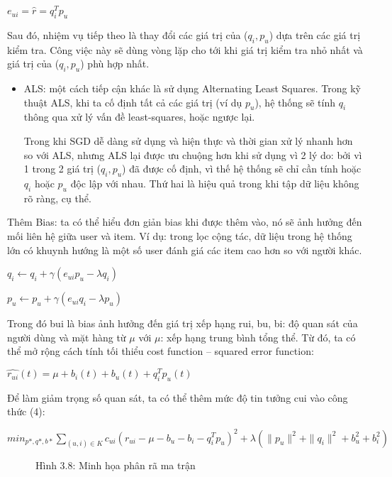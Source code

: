 \documentclass[a4paper,12pt,numbered,print,index,custombib, oneside, custommargin]{report}
\newcommand\tab[1][1cm]{\hspace*{#1}}
\begin{document}
\tab $e_{ui} = \hat{r} = q_i^T p_u $	\par


\tab Sau đó, nhiệm vụ tiếp theo là 	thay đổi các giá trị của ($q_i, p_u$) dựa trên các \tab giá trị kiểm tra. Công việc này sẽ dùng vòng lặp cho tới khi giá trị kiểm tra \tab nhỏ nhất và giá trị của ($q_i, p_u$) phù hợp nhất.
\begin{itemize}
\item ALS: một cách tiếp cận khác là sử dụng Alternating Least Squares. Trong kỹ thuật ALS, khi ta cố định tất cả các giá trị (ví dụ $p_u$), hệ thống sẽ tính $q_i$ thông qua xử lý vấn đề least-squares, hoặc ngược lại.\par
Trong khi SGD dễ dàng sử dụng và hiện thực và thời gian xử lý nhanh hơn so với ALS, nhưng ALS lại được ưu chuộng hơn khi sử dụng vì 2 lý do: bởi vì 1 trong 2 giá trị ($q_i, p_u$) đã được cố định, vì thế hệ thống sẽ chỉ cần tính hoặc $q_i$ hoặc $p_u$ độc lập với nhau. Thứ hai là hiệu quả trong khi tập dữ liệu không rõ ràng, cụ thể. 
\end{itemize}
Thêm Bias: ta có thể hiểu đơn giản bias khi được thêm vào, nó sẽ ảnh hưởng đến mối liên hệ giữa user và item. Ví dụ: trong lọc cộng tác, dữ liệu trong hệ thống lớn có khuynh hướng là một số user đánh giá các item cao hơn so với người khác.

\tab $q_i \leftarrow q_i + \gamma(e_{ui}p_{u} - \lambda q_i)$ \par
\tab $p_u \leftarrow p_u + \gamma(e_{ui}q_{i} - \lambda p_u)$ \par


Trong đó bui là bias ảnh hưởng đến giá trị xếp hạng rui, bu, bi: độ quan sát của người dùng và mặt hàng từ $\mu$ với $\mu$: xếp hạng trung bình tổng thể. 
Từ đó, ta có thể mở rộng cách tính tối thiểu cost function – squared error function: \par 
\tab $\hat{r_{ui}}(t) = \mu + b_i(t) +b_u(t) + q_i^T p_u(t)$ \par

Để làm giảm trọng số quan sát, ta có thể thêm mức độ tin tưởng cui vào công thức (4):	 \par

$min_{p*, q*, b*}\sum_{(u,i)\in K} c_{ui}(r_{ui} - \mu - b_u - b_i - q_i^T p_u)^2 + \lambda(\parallel p_u \parallel^2 + \parallel q_i \parallel^2 + b_u^2 + b_i^2)$ \par

\begin{figure}[h]
\centering
\caption{Hình 3.8: Minh họa phân rã ma trận}
\end{figure}		\par
\end{document}
